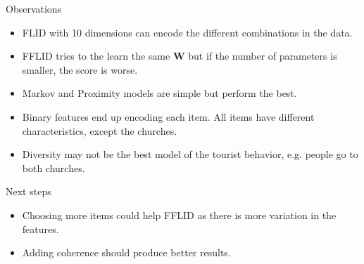 \documentclass{beamer}
\begin{document}
  \begin{frame}{Observations}
    \begin{itemize}
      \item FLID with 10 dimensions can encode the different combinations in the data.
      \item FFLID tries to the learn the same $\bm{W}$ but if the number of parameters is smaller, the score is worse.
      \item Markov and Proximity models are simple but perform the best.
      \item Binary features end up encoding each item. All items have different characteristics, except the churches.
      \item Diversity may not be the best model of the tourist behavior, e.g. people go to both churches.
    \end{itemize}
  \end{frame}
  
  \begin{frame}{Next steps}
    \begin{itemize}
      \item Choosing more items could help FFLID as there is more variation in the features.
      \item Adding coherence should produce better results.
    \end{itemize}
  \end{frame}
\end{document}
